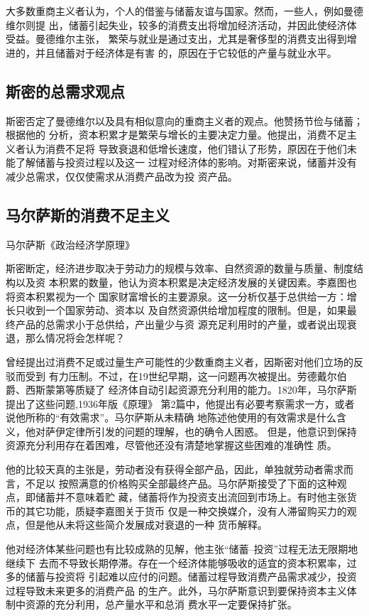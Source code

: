 大多数重商主义者认为，个人的借鉴与储蓄友谊与国家。然而，一些人，例如曼德维尔则提
出，储蓄引起失业，较多的消费支出将增加经济活动，并因此使经济体受益。曼德维尔主张，
繁荣与就业是通过支出，尤其是奢侈型的消费支出得到增进的，并且储蓄对于经济体是有害
的，原因在于它较低的产量与就业水平。

\subsection{斯密的总需求观点}

斯密否定了曼德维尔以及具有相似意向的重商主义者的观点。他赞扬节俭与储蓄；根据他的
分析，资本积累才是繁荣与增长的主要决定力量。他提出，消费不足主义者认为消费不足将
导致衰退和低增长速度，他们错认了形势，原因在于他们未能了解储蓄与投资过程以及这一
过程对经济体的影响。对斯密来说，储蓄并没有减少总需求，仅仅使需求从消费产品改为投
资产品。

\subsection{马尔萨斯的消费不足主义}

马尔萨斯《政治经济学原理》

斯密断定，经济进步取决于劳动力的规模与效率、自然资源的数量与质量、制度结构以及资
本积累的数量，他认为资本积累是决定经济发展的关键因素。李嘉图也将资本积累视为一个
国家财富增长的主要源泉。这一分析仅基于总供给一方：增长只收到一个国家劳动、资本以
及自然资源供给增加程度的限制。但是，如果最终产品的总需求小于总供给，产出量少与资
源充足利用时的产量，或者说出现衰退，那么情况将会怎样呢？

曾经提出过消费不足或过量生产可能性的少数重商主义者，因斯密对他们立场的反驳而受到
有力压制。不过，在19世纪早期，这一问题再次被提出。劳德戴尔伯爵、西斯蒙第等质疑了
经济体自动引起资源充分利用的能力。1820年，马尔萨斯提出了这些问题,1936年版《原理》
第2篇中，他提出有必要考察需求一方，或者说他所称的“有效需求”。马尔萨斯从未精确
地陈述他使用的有效需求是什么含义，他对萨伊定律所引发的问题的理解，也的确令人困惑。
但是，他意识到保持资源充分利用存在着困难，尽管他还没有清楚地掌握这些困难的准确性
质。

他的比较天真的主张是，劳动者没有获得全部产品，因此，单独就劳动者需求而言，不足以
按照满意的价格购买全部最终产品。马尔萨斯接受了下面的这种观点，即储蓄并不意味着贮
藏，储蓄将作为投资支出流回到市场上。有时他主张货币的其它功能，质疑李嘉图关于货币
仅是一种交换媒介，没有人滞留购买力的观点，但是他从未将这些简介发展成对衰退的一种
货币解释。

他对经济体某些问题也有比较成熟的见解，他主张“储蓄--投资”过程无法无限期地继续下
去而不导致长期停滞。存在一个经济体能够吸收的适宜的资本积累率，过多的储蓄与投资将
引起难以应付的问题。储蓄过程导致消费产品需求减少，投资过程导致未来更多的消费产品
的生产。此外，马尔萨斯意识到要保持资本主义体制中资源的充分利用，总产量水平和总消
费水平一定要保持扩张。

